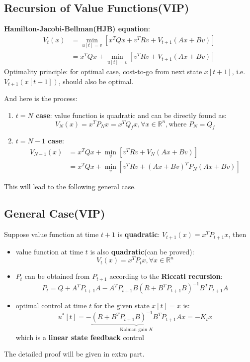 \documentclass[10pt,a4paper,oneside]{article}
\begin{document}
\subsection{Recursion of Value Functions(VIP)}
\textbf{Hamilton-Jacobi-Bellman(HJB) equation}:
\[
\begin{aligned}
V_t(x) &= \min_{u[t]=v}[x^TQx+v^TRv+V_{t+1}(Ax+Bv)]\\
&= x^TQx+\min_{u[t]=v}[v^TRv+V_{t+1}(Ax+Bv)]
\end{aligned}
\]
Optimality principle: for optimal case, cost-to-go from next state $x[t+1]$, i.e. $V_{t+1}(x[t+1])$, should also be optimal. \\
And here is the process:
\begin{enumerate}
	\item \textbf{$t=N$ case}: value function is quadratic and can be directly found as:
	\[
	V_N(x)=x^T P_N x = x^T Q_f x,\forall x\in \mathbb{R}^n,\text{where }P_N=Q_f
	\]
	\item \textbf{$t=N-1$ case}:
	\[
	\begin{aligned}
	V_{N-1}(x) &= x^T Q x + \min_{v}[v^T R v+V_N(Ax+Bv)]\\
	&= x^T Q x + \min_{v}[v^T R v+(Ax+Bv)^T P_N (Ax+Bv)]
	\end{aligned}
	\]
\end{enumerate}
This will lead to the following general case.

\subsection{General Case(VIP)}
Suppose value function at time $t+1$ is \textbf{quadratic}: $V_{t+1}(x)=x^TP_{t+1}x$, then
\begin{itemize}
	\item value function at time $t$ is also \textbf{quadratic}(can be proved):
	\[
	V_t(x)=x^T P_t x, \forall x\in \mathbb{R}^n
	\]
	\item $P_t$ can be obtained from $P_{t+1}$ according to the \textbf{Riccati recursion}:
	\[
	P_t=Q+A^TP_{t+1}A - A^TP_{t+1}B(R+B^TP_{t+1}B)^{-1}B^TP_{t+1}A
	\]
	\item optimal control at time $t$ for the given state $x[t]=x$ is:
	\[
	u^*[t] = -\underbrace{(R+B^T P_{t+1} B)^{-1}B^T P_{t+1} A }_{\text{Kalman gain } K} x= - K_tx
	\]
	which is a \textbf{linear state feedback} control
\end{itemize}
The detailed proof will be given in extra part.
\end{document}
